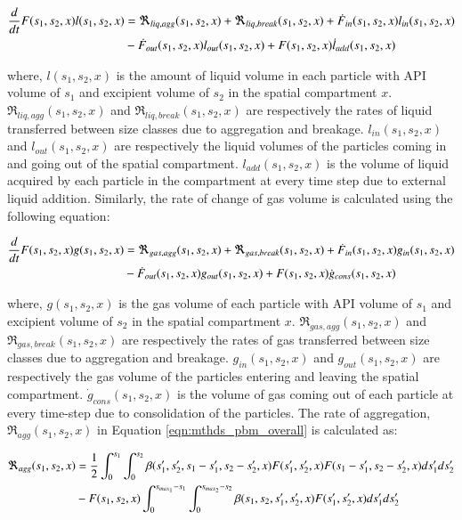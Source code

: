 \documentclass[preprint,11pt,authoryear]{elsarticle}
\begin{document}
\begin{align}
\frac{d}{dt}F(s_1,s_2,x)l(s_1,s_2,x)&= 
\Re_{liq,agg}(s_1,s_2,x)+\Re_{liq,break}(s_1,s_2,x)+\dot{F}_{in}(s_1,s_2,x)l_{in}(s_1,s_2,x)\notag\\
&-\dot{F}_{out}(s_1,s_2,x)l_{out}(s_1,s_2,x)+F(s_1,s_2,x)\dot{l}_{add}(s_1,s_2,x)
\label{eqn:mthds_pbm_rate} 
\end{align}

where, $l(s_1,s_2,x)$ is the amount of liquid volume in each particle with API volume of $s_1$ and 
excipient volume of $s_2$ in the spatial compartment $x$. $\Re_{liq,agg}(s_1,s_2,x)$ and 
$\Re_{liq,break}(s_1,s_2,x)$ are respectively the rates of liquid transferred between size classes due to 
aggregation and breakage. $l_{in}(s_1,s_2,x)$ and $l_{out}(s_1,s_2,x)$ are respectively the liquid 
volumes of the particles coming in and going out of the spatial compartment. $l_{add}(s_1,s_2,x)$ is 
the volume of liquid acquired by each particle in the compartment at every time step due to external 
liquid addition.
Similarly, the rate of change of gas volume is calculated using the following equation: 

\begin{align}
\frac{d}{dt}F(s_1,s_2,x)g(s_1,s_2,x)&= 
\Re_{gas,agg}(s_1,s_2,x)+\Re_{gas,break}(s_1,s_2,x)+\dot{F}_{in}(s_1,s_2,x)g_{in}(s_1,s_2,x)\notag\\
&-\dot{F}_{out}(s_1,s_2,x)g_{out}(s_1,s_2,x)+F(s_1,s_2,x)\dot{g}_{cons}(s_1,s_2,x)
\label{eqn:mthds_pbm_gas_agg} 
\end{align}

where, $g(s_1,s_2,x)$ is the gas volume of each particle with API volume of $s_1$ and excipient 
volume of $s_2$ in the spatial compartment $x$. $\Re_{gas,agg}(s_1,s_2,x)$ and 
$\Re_{gas,break}(s_1,s_2,x)$ are respectively the rates of gas transferred between size classes due to 
aggregation and breakage. $g_{in}(s_1,s_2,x)$ and $g_{out}(s_1,s_2,x)$ are respectively the gas 
volume of the particles entering and leaving the spatial compartment. $\dot{g}_{cons}(s_1,s_2,x)$ is the 
volume of gas coming out of each particle at every time-step due to consolidation of the particles. 
The rate of aggregation, $\Re_{agg}(s_1,s_2,x)$ in Equation \ref{eqn:mthds_pbm_overall} is 
calculated as: \citep{Chaturbedi2017}

\begin{align}
\Re_{agg}(s_1,s_2,x)&= \frac{1}{2}\int _0^{s_1} \int_0^{s_2} 
\beta(s_1',s_2',s_1-s_1',s_2-s_2',x)F(s_1',s_2',x)F(s_1-s_1',s_2-s_2',x)ds_1'ds_2'\notag\\ 
&- F(s_1,s_2,x)\int _0^{s_{max_1}-s_1} \int_0^{s_{max_2}-s_2} 
\beta(s_1,s_2,s_1',s_2',x)F(s_1',s_2',x)ds_1'ds_2'
\end{align}
\end{document}
